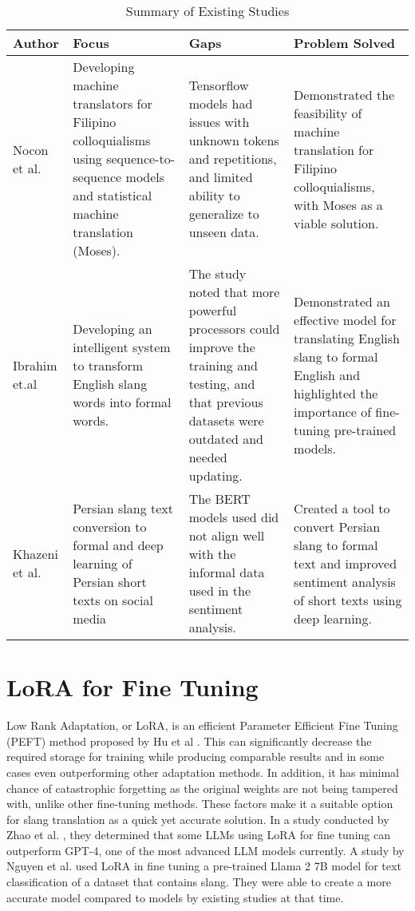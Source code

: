 \begin{table}[ht]  
	\centering
	\caption{Summary of Existing Studies} \vspace{0.25em}
	\begin{tabular}{|p{1in}|p{1in}|p{1in} | p{1in}|} \hline
		\centering Author
		& Focus 
		& Gaps 
		& Problem Solved  \\ \hline
		
		Nocon et al.    
		& Developing machine translators for Filipino colloquialisms using sequence-to-sequence models and statistical machine translation (Moses). & Tensorflow models had issues with unknown tokens and repetitions, and limited ability to generalize to unseen data.
		& Demonstrated the feasibility of machine translation for Filipino colloquialisms, with Moses as a viable solution.
		\\ \hline
		
		Ibrahim et.al  
		& Developing an intelligent system to transform English slang words into formal words.
		& The study noted that more powerful processors could improve the training and testing, and that previous datasets were outdated and needed updating.
		& Demonstrated an effective model for translating English slang to formal English and highlighted the importance of fine-tuning pre-trained models.
		\\ \hline
		
		Khazeni et al.
		& Persian slang text conversion to formal and deep learning of Persian short texts on social media
		& The BERT models used did not align well with the informal data used in the sentiment analysis.
		& Created a tool to convert Persian slang to formal text and improved sentiment analysis of short texts using deep learning.
		\\ \hline
		
	\end{tabular}
	\label{tab:timetableactivities}
\end{table}

\section{LoRA for Fine Tuning}
Low Rank Adaptation, or LoRA, is an efficient Parameter Efficient Fine Tuning (PEFT) method proposed by Hu et al \cite{hu2021loralowrankadaptationlarge}.
This can significantly decrease the required storage for training while producing comparable results and in some cases even outperforming other adaptation methods.
In addition, it has minimal chance of catastrophic forgetting as the original weights are not being tampered with, unlike other fine-tuning methods.
These factors make it a suitable option for slang translation as a quick yet accurate solution.
In a study conducted by Zhao et al. \cite{zhao2024loraland310finetuned}, they determined that some LLMs using LoRA for fine tuning can outperform GPT-4, one of the most advanced LLM models currently.
A study by Nguyen et al. \cite{nguyen2023finetuningllama2large} used LoRA in fine tuning a pre-trained Llama 2 7B model for text classification of a dataset that contains slang.
They were able to create a more accurate model compared to models by existing studies at that time. 

